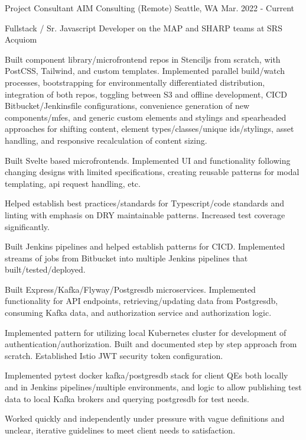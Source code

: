 \begin{cventries}
\cventry
{Project Consultant} %
{AIM Consulting (Remote)} %
{Seattle, WA} %
{Mar. 2022 - Current} %
{
\begin{cvitems}
\item[] {Fullstack / Sr. Javascript Developer on the MAP and SHARP teams at SRS Acquiom}
\item[]
\item {Built component library/microfrontend repos in Stenciljs from scratch, with PostCSS, Tailwind, and custom templates. Implemented parallel build/watch processes, bootstrapping for environmentally differentiated distribution, integration of both repos, toggling between S3 and offline development, CICD Bitbucket/Jenkinsfile configurations, convenience generation of new components/mfes, and generic custom elements and stylings and spearheaded approaches for shifting content, element types/classes/unique ids/stylings, asset handling, and responsive recalculation of content sizing.}
\item {Built Svelte based microfrontends. Implemented UI and functionality following changing designs with limited specifications, creating reusable patterns for modal templating, api request handling, etc.}
\item {Helped establish best practices/standards for Typescript/code standards and linting with emphasis on DRY maintainable patterns. Increased test coverage significantly.}
\item {Built Jenkins pipelines and helped establish patterns for CICD. Implemented streams of jobs from Bitbucket into multiple Jenkins pipelines that built/tested/deployed.}
\item {Built Express/Kafka/Flyway/Postgresdb microservices. Implemented functionality for API endpoints, retrieving/updating data from Postgresdb, consuming Kafka data, and authorization service and authorization logic.}
\item {Implemented pattern for utilizing local Kubernetes cluster for development of authentication/authorization. Built and documented step by step approach from scratch. Established Istio JWT security token configuration.}
\item {Implemented pytest docker kafka/postgresdb stack for client QEs both locally and in Jenkins pipelines/multiple environments, and logic to allow publishing test data to local Kafka brokers and querying postgresdb for test needs.}
\item {Worked quickly and independently under pressure with vague definitions and unclear, iterative guidelines to meet client needs to satisfaction.}
\end{cvitems}
}


\end{cventries}
